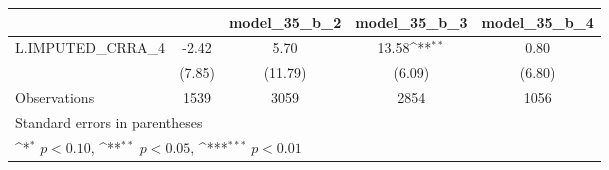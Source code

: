 {
\def\sym#1{\ifmmode^{#1}\else\(^{#1}\)\fi}
\begin{tabular}{l*{4}{c}}
\toprule
                &\multicolumn{1}{c}{}&\multicolumn{1}{c}{model\_35\_b\_2}&\multicolumn{1}{c}{model\_35\_b\_3}&\multicolumn{1}{c}{model\_35\_b\_4}\\
\midrule
L.IMPUTED\_CRRA\_4&    -2.42         &     5.70         &    13.58\sym{**} &     0.80         \\
                &   (7.85)         &  (11.79)         &   (6.09)         &   (6.80)         \\
\midrule
Observations    &     1539         &     3059         &     2854         &     1056         \\
\bottomrule
\multicolumn{5}{l}{\footnotesize Standard errors in parentheses}\\
\multicolumn{5}{l}{\footnotesize \sym{*} \(p<0.10\), \sym{**} \(p<0.05\), \sym{***} \(p<0.01\)}\\
\end{tabular}
}
